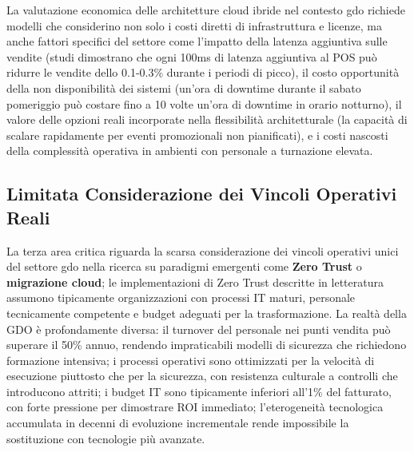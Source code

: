 La valutazione economica delle architetture cloud ibride nel contesto \gls{gdo} richiede modelli che considerino non solo i costi diretti di infrastruttura e licenze, ma anche fattori specifici del settore come l'impatto della latenza aggiuntiva sulle vendite (studi dimostrano che ogni 100ms di latenza aggiuntiva al POS può ridurre le vendite dello 0.1-0.3\% durante i periodi di picco), il costo opportunità della non disponibilità dei sistemi (un'ora di downtime durante il sabato pomeriggio può costare fino a 10 volte un'ora di downtime in orario notturno), il valore delle opzioni reali incorporate nella flessibilità architetturale (la capacità di scalare rapidamente per eventi promozionali non pianificati), e i costi nascosti della complessità operativa in ambienti con personale a turnazione elevata.

\subsection{\texorpdfstring{\textbf{Limitata Considerazione dei Vincoli Operativi Reali}}{1.2.3 - Limitata Considerazione dei Vincoli Operativi Reali}}

La terza area critica riguarda la scarsa considerazione dei vincoli operativi unici del settore \gls{gdo} nella ricerca su paradigmi emergenti come \textbf{Zero Trust} o \textbf{migrazione cloud}; le implementazioni di Zero Trust descritte in letteratura assumono tipicamente organizzazioni con processi IT maturi, personale tecnicamente competente e budget adeguati per la trasformazione. La realtà della GDO è profondamente diversa: il turnover del personale nei punti vendita può superare il 50\% annuo, rendendo impraticabili modelli di sicurezza che richiedono formazione intensiva; i processi operativi sono ottimizzati per la velocità di esecuzione piuttosto che per la sicurezza, con resistenza culturale a controlli che introducono attriti; i budget IT sono tipicamente inferiori all'1\% del fatturato, con forte pressione per dimostrare ROI immediato; l'eterogeneità tecnologica accumulata in decenni di evoluzione incrementale rende impossibile la sostituzione con tecnologie più avanzate.

